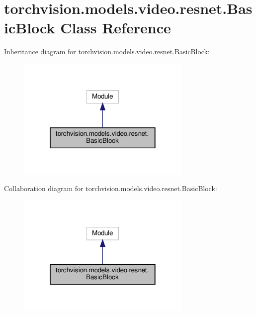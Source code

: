 \hypertarget{classtorchvision_1_1models_1_1video_1_1resnet_1_1BasicBlock}{}\section{torchvision.\+models.\+video.\+resnet.\+Basic\+Block Class Reference}
\label{classtorchvision_1_1models_1_1video_1_1resnet_1_1BasicBlock}


Inheritance diagram for torchvision.\+models.\+video.\+resnet.\+Basic\+Block\+:
\nopagebreak
\begin{figure}[H]
\begin{center}
\leavevmode
\includegraphics[width=238pt]{classtorchvision_1_1models_1_1video_1_1resnet_1_1BasicBlock__inherit__graph}
\end{center}
\end{figure}


Collaboration diagram for torchvision.\+models.\+video.\+resnet.\+Basic\+Block\+:
\nopagebreak
\begin{figure}[H]
\begin{center}
\leavevmode
\includegraphics[width=238pt]{classtorchvision_1_1models_1_1video_1_1resnet_1_1BasicBlock__coll__graph}
\end{center}
\end{figure}
